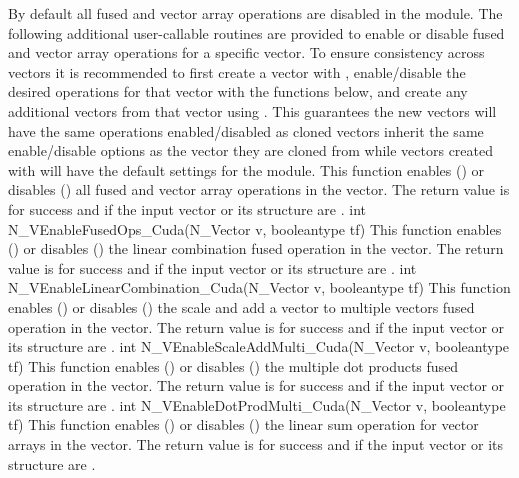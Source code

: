 By default all fused and vector array operations are disabled in the {\nveccuda}
module. The following additional user-callable routines are provided to
enable or disable fused and vector array operations for a specific vector. To
ensure consistency across vectors it is recommended to first create a vector
with , enable/disable the desired operations for that vector
with the functions below, and create any additional vectors from that vector
using . This guarantees the new vectors will have the same
operations enabled/disabled as cloned vectors inherit the same enable/disable
options as the vector they are cloned from while vectors created with
 will have the default settings for the {\nveccuda} module.
{
  This function enables () or disables () all fused and
  vector array operations in the {\cuda} vector. The return value is  for
  success and  if the input vector or its  structure are .
}
{
  int N\_VEnableFusedOps\_Cuda(N\_Vector v, booleantype tf)
}
{
  This function enables () or disables () the linear
  combination fused operation in the {\cuda} vector. The return value is  for
  success and  if the input vector or its  structure are .
}
{
  int N\_VEnableLinearCombination\_Cuda(N\_Vector v, booleantype tf)
}
{
  This function enables () or disables () the scale and
  add a vector to multiple vectors fused operation in the {\cuda} vector. The
  return value is  for success and  if the input vector or its
   structure are .
}
{
  int N\_VEnableScaleAddMulti\_Cuda(N\_Vector v, booleantype tf)
}
{
  This function enables () or disables () the multiple
  dot products fused operation in the {\cuda} vector. The return value is 
  for success and  if the input vector or its  structure are
  .
}
{
  int N\_VEnableDotProdMulti\_Cuda(N\_Vector v, booleantype tf)
}
{
  This function enables () or disables () the linear sum
  operation for vector arrays in the {\cuda} vector. The return value is  for
  success and  if the input vector or its  structure are .
}
